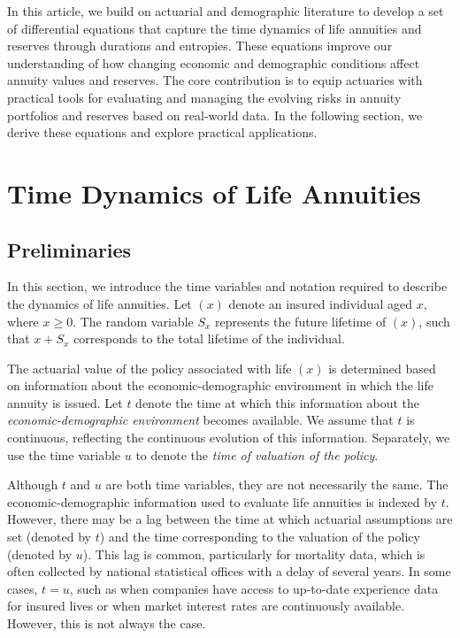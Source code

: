 \documentclass[12pt]{article}
\begin{document}
In this article, we build on actuarial and demographic literature to develop a set of differential equations that capture the time dynamics of life annuities and reserves through durations and entropies. These equations improve our understanding of how changing economic and demographic conditions affect annuity values and reserves. The core contribution is to equip actuaries with practical tools for evaluating and managing the evolving risks in annuity portfolios and reserves based on real-world data. In the following section, we derive these equations and explore practical applications. 


\section{Time Dynamics of Life Annuities}\label{sec:TimeDynamics}
\subsection{Preliminaries}\label{preliminaries}

In this section, we introduce the time variables and notation required to describe the dynamics of life annuities. Let $(x)$ denote an insured individual aged $x$, where $x \geq 0$. The random variable \( S_x \) represents the future lifetime of $(x)$, such that \( x + S_x \) corresponds to the total lifetime of the individual. 

The actuarial value of the policy associated with life $(x)$ is determined based on information about the economic-demographic environment in which the life annuity is issued. Let \(t\) denote the  time at which this information about the \textit{economic-demographic environment} becomes available. We assume that \(t\) is continuous, reflecting the continuous evolution of this information. Separately, we use  the time variable \(u\) to denote the \textit{time of valuation of the policy}.

Although \( t \) and \( u \) are both time variables, they are not necessarily the same. The economic-demographic information used to evaluate life annuities is indexed by \( t \). However, there may be a lag between the time at which actuarial assumptions are set (denoted by \( t \)) and the time corresponding to the valuation of the policy (denoted by \( u \)). This lag is common, particularly for mortality data, which is often collected by national statistical offices with a delay of several years. In some cases, \( t = u \), such as when companies have access to up-to-date experience data for insured lives or when market interest rates are continuously available. However, this is not always the case.
\end{document}
